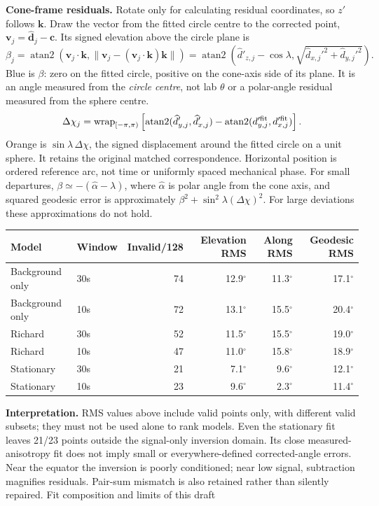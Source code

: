 \documentclass[10pt,a4paper]{article}
\begin{document}
\textbf{Cone-frame residuals.} Rotate only for calculating residual coordinates, so $z'$ follows $\mathbf k$. Draw the vector from the fitted circle centre to the corrected point, $\mathbf v_j=\widehat{\mathbf d}_j-\mathbf c$. Its signed elevation above the circle plane is
\[
\beta_j=\operatorname{atan2}\left(\mathbf v_j\cdot\mathbf k,
\|\mathbf v_j-(\mathbf v_j\cdot\mathbf k)\mathbf k\|\right)
=\operatorname{atan2}\left(\widehat d'_{z,j}-\cos\lambda,
\sqrt{\widehat d_{x,j}'^2+\widehat d_{y,j}'^2}\right).
\]
Blue is $\beta$: zero on the fitted circle, positive on the cone-axis side of its plane. It is an angle measured from the \emph{circle centre}, not lab $\theta$ or a polar-angle residual measured from the sphere centre.
\[
\Delta\chi_j=\operatorname{wrap}_{[-\pi,\pi)}
\left[\operatorname{atan2}(\widehat d'_{y,j},\widehat d'_{x,j})-
\operatorname{atan2}(d'^{\rm fit}_{y,j},d'^{\rm fit}_{x,j})\right].
\]
Orange is $\sin\lambda\,\Delta\chi$, the signed displacement around the fitted circle on a unit sphere. It retains the original matched correspondence. Horizontal position is ordered reference arc, not time or uniformly spaced mechanical phase. For small departures, $\beta\simeq-(\widehat\alpha-\lambda)$, where $\widehat\alpha$ is polar angle from the cone axis, and squared geodesic error is approximately $\beta^2+\sin^2\lambda(\Delta\chi)^2$. For large deviations these approximations do not hold.

\begin{tabular}{llrrrr}\toprule
Model & Window & Invalid/128 & Elevation RMS & Along RMS & Geodesic RMS\\\midrule
Background only & 30s & 74 & 12.9$^\circ$ & 11.3$^\circ$ & 17.1$^\circ$ \\
Background only & 10s & 72 & 13.1$^\circ$ & 15.5$^\circ$ & 20.4$^\circ$ \\
Richard & 30s & 52 & 11.5$^\circ$ & 15.5$^\circ$ & 19.0$^\circ$ \\
Richard & 10s & 47 & 11.0$^\circ$ & 15.8$^\circ$ & 18.9$^\circ$ \\
Stationary & 30s & 21 & 7.1$^\circ$ & 9.6$^\circ$ & 12.1$^\circ$ \\
Stationary & 10s & 23 & 9.6$^\circ$ & 2.3$^\circ$ & 11.4$^\circ$ \\
\bottomrule\end{tabular}

\textbf{Interpretation.} RMS values above include valid points only, with different valid subsets; they must not be used alone to rank models. Even the stationary fit leaves 21/23 points outside the signal-only inversion domain. Its close measured-anisotropy fit does not imply small or everywhere-defined corrected-angle errors. Near the equator the inversion is poorly conditioned; near low signal, subtraction magnifies residuals. Pair-sum mismatch is also retained rather than silently repaired.
\newpage
{\Large Fit composition and limits of this draft}
\end{document}
